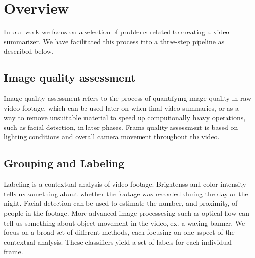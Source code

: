 \section{Overview}
%
In our work we focus on a selection of problems related to creating a video summarizer. We have facilitated this process into a three-step pipeline as described below.
%
\subsection{Image quality assessment}\label{sec:videoclipsegmentation}
%
Image quality assessment refers to the process of quantifying image quality in raw video footage, %
which can be used later on when final video summaries, or as a way to remove unsuitable material to speed up computionally heavy operations, such as facial detection, in later phases. %
Frame quality assessment is based on lighting conditions and overall camera movement throughout the video.
%
\subsection{Grouping and Labeling}
%
Labeling is a contextual analysis of video footage. 
Brightenss and color intensity tells us something about whether the footage was recorded during the day or the night. Facial detection can be used to estimate the number, and proximity, of people in the footage. 
More advanced image processesing such as optical flow can tell us something about object movement in the video, ex. a waving banner. 
We focus on a broad set of different methods, each focusing on one aspect of the contextual analysis. These classifiers yield a set of labels for each individual frame.
%
